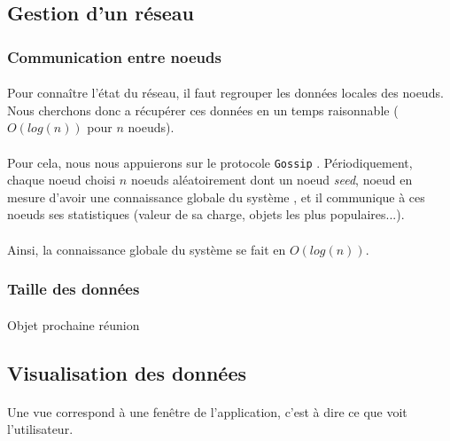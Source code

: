 \documentclass[12pt]{article}
\begin{document}
\subsection{Gestion d'un réseau}

\subsubsection{Communication entre noeuds}

\paragraph{}Pour connaître l'état du réseau, il faut regrouper les données locales des noeuds.
Nous cherchons donc a récupérer ces données en un temps raisonnable ($O(log(n))$ pour $n$ noeuds).

\paragraph{}Pour cela, nous nous appuierons sur le protocole \texttt{Gossip} \cite{gossip}.
Périodiquement, chaque noeud choisi $n$ noeuds aléatoirement dont un noeud \textit{seed}, noeud en mesure d'avoir une connaissance globale du système \cite{seed}, et il communique à ces noeuds ses statistiques (valeur de sa charge, objets les plus populaires...).

\paragraph{}Ainsi, la connaissance globale du système se fait en $O(log(n))$.


\subsubsection{Taille des données}

\paragraph{}Objet prochaine réunion


\subsection{Visualisation des données}

\paragraph{} Une vue correspond à une fenêtre de l'application, c'est à dire ce que voit l'utilisateur.
\end{document}
